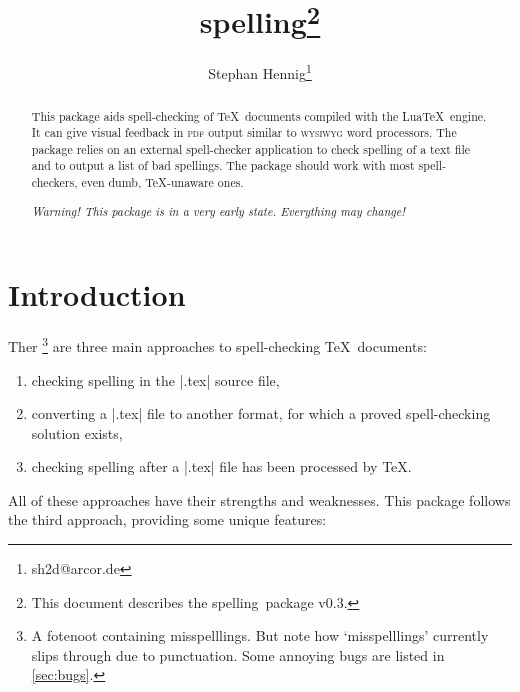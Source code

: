 \documentclass[11pt]{article}
\newcommand*{\pkg}{\textsf{spelling}}
\newcommand*{\acr}[1]{\mbox{\scshape#1}}
\begin{document}
\author{Stephan Hennig\thanks{sh2d@arcor.de}}
\title{\pkg\thanks{This document describes the \pkg\ package v0.3.}}
\maketitle


\begin{abstract}
  This package aids spell-checking of \TeX\ documents compiled with the
  Lua\TeX\ engine.  It can give visual feedback in \acr{pdf} output
  similar to \acr{wysiwyg} word processors.  The package relies on an
  external spell-checker application to check spelling of a text file
  and to output a list of bad spellings.  The package should work with
  most spell-checkers, even dumb, \TeX-unaware ones.

  \emph{Warning!  This package is in a very early state.  Everything may
    change!}
\end{abstract}

\begin{multicols}{2}
\small
\makeatletter
\renewcommand{\@tocrmarg}{2.55em plus1fil}
\makeatother
\tableofcontents
\end{multicols}


\section{Introduction}
\label{sec:intro}

Ther%
\footnote{A fotenoot containing misspelllings.  But note how
  `misspelllings' currently slips through due to punctuation.  Some
  annoying bugs are listed in \autoref{sec:bugs}.}
%
are three main approaches to spell-checking \TeX\ documents:

\begin{enumerate}

\item checking spelling in the |.tex| source file,

\item converting a |.tex| file to another format, for which a proved
  spell-checking solution exists,

\item checking spelling after a |.tex| file has been processed by \TeX.

\end{enumerate}

All of these approaches have their strengths and weaknesses.  This
package follows the third approach, providing some unique features:
\end{document}
